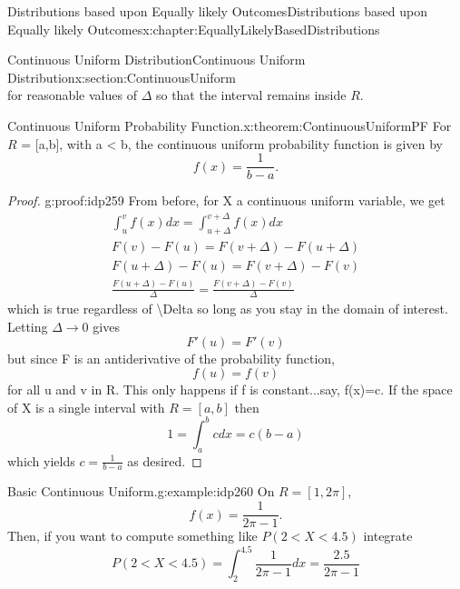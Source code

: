 \documentclass[oneside,10pt,]{book}
\numberwithin{equation}{section}
\begin{document}
\begin{chapterptx}{Distributions based upon Equally likely Outcomes}{}{Distributions based upon Equally likely Outcomes}{}{}{x:chapter:EquallyLikelyBasedDistributions}
\begin{sectionptx}{Continuous Uniform Distribution}{}{Continuous Uniform Distribution}{}{}{x:section:ContinuousUniform}
\begin{equation*}
\end{equation*}
for reasonable values of \(\Delta\) so that the interval remains inside \(R\).%
\par
\begin{theorem}{Continuous Uniform Probability Function.}{}{x:theorem:ContinuousUniformPF}%
For \(R\) = [a,b], with a \textless{} b, the continuous uniform probability function is given by%
\begin{equation*}
f(x) = \frac{1}{b-a}.
\end{equation*}
%
\end{theorem}
\begin{proof}{}{g:proof:idp259}
From before, for X a continuous uniform variable, we get%
\begin{gather*}
\int_u^v f(x) dx = \int_{u+\Delta}^{v+\Delta} f(x) dx\\
F(v)-F(u) = F(v+\Delta)-F(u+\Delta)\\
F(u+\Delta)-F(u) = F(v+\Delta)-F(v)\\
\frac{F(u+\Delta)-F(u)}{\Delta} = \frac{F(v+\Delta)-F(v)}{\Delta}
\end{gather*}
which is true regardless of \textbackslash{}Delta so long as you stay in the domain of interest. Letting \(\Delta \rightarrow 0\) gives%
\begin{equation*}
F'(u) = F'(v)
\end{equation*}
but since F is an antiderivative of the probability function,%
\begin{equation*}
f(u) = f(v)
\end{equation*}
for all u and v in R. This only happens if f is constant...say, f(x)=c. If the space of X is a single interval with \(R = [a,b]\) then%
\begin{equation*}
1 = \int_a^b c dx = c(b-a)
\end{equation*}
which yields \(c = \frac{1}{b-a}\) as desired.%
\end{proof}
%
\par
\begin{example}{Basic Continuous Uniform.}{g:example:idp260}%
On \(R = [1,2 \pi]\),%
\begin{equation*}
f(x) = \frac{1}{2 \pi - 1}.
\end{equation*}
Then, if you want to compute something like \(P(2 < X < 4.5)\) integrate%
\begin{equation*}
P(2 < X < 4.5) = \int_2^{4.5} \frac{1}{2 \pi -1} dx = \frac{2.5}{2 \pi - 1}
\end{equation*}
%
\end{example}

\end{sectionptx}
\end{chapterptx}
\end{document}
